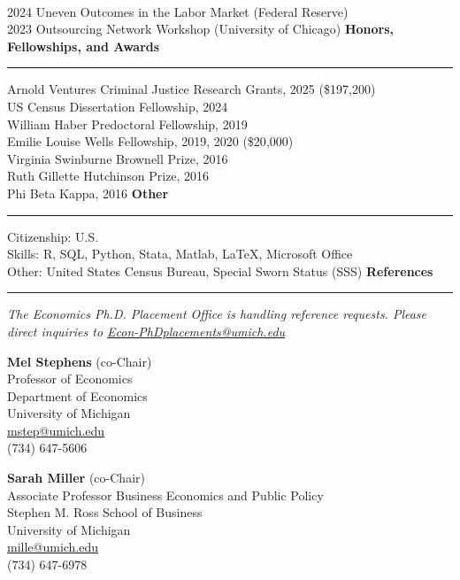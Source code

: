 \documentclass[12pt,letterpaper]{article}
\newcommand{\cvheading}[1]{%
    \vspace{0.5cm}
    {\Large \textbf{#1}}
    \vspace{0.1cm}
    \hrule
    \vspace{0.2cm}
}
\begin{document}
\\[0.1cm]
2024 \hspace{0.5cm} Uneven Outcomes in the Labor Market (Federal Reserve)
\\[0.1cm]
2023 \hspace{0.5cm} Outsourcing Network Workshop (University of Chicago)
\cvheading{Honors, Fellowships, and Awards}
Arnold Ventures Criminal Justice Research Grants, 2025 (\$197{,}200)
\\[0.1cm]
US Census Dissertation Fellowship, 2024
\\[0.1cm]
William Haber Predoctoral Fellowship, 2019
\\[0.1cm]
Emilie Louise Wells Fellowship, 2019, 2020 (\$20{,}000)
\\[0.1cm]
Virginia Swinburne Brownell Prize, 2016
\\[0.1cm]
Ruth Gillette Hutchinson Prize, 2016
\\[0.1cm]
Phi Beta Kappa, 2016
\cvheading{Other}
Citizenship: U.S.
\\[0.1cm]
Skills: R, SQL, Python, Stata, Matlab, \LaTeX, Microsoft Office
\\[0.1cm]
Other: United States Census Bureau, Special Sworn Status (SSS)
\newpage
\cvheading{References}
\textit{The Economics Ph.D. Placement Office is handling reference requests. Please direct inquiries to \href{mailto:Econ-PhDplacements@umich.edu}{Econ-PhDplacements@umich.edu}}
\vspace{0.3cm}
\begin{minipage}[t]{0.49\textwidth}
\textbf{Mel Stephens} (co-Chair)\\
Professor of Economics\\
Department of Economics\\
University of Michigan\\
\href{mailto:mstep@umich.edu}{mstep@umich.edu}\\
(734) 647-5606
\end{minipage}
\hfill
\begin{minipage}[t]{0.49\textwidth}
\textbf{Sarah Miller} (co-Chair)\\
Associate Professor Business Economics and Public Policy\\
Stephen M. Ross School of Business\\
University of Michigan\\
\href{mailto:mille@umich.edu}{mille@umich.edu}\\
(734) 647-6978
\end{minipage}
\end{document}

